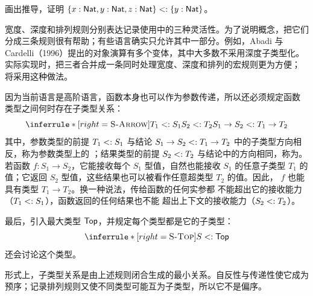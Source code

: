 \begin{exercise}[\(\star\)]
\label{ex:15.2.1}
画出推导，证明
\(\{x:\mathsf{Nat},y:\mathsf{Nat},z:\mathsf{Nat}\}\mathrel{<:}
\{y:\mathsf{Nat}\}\)。
\end{exercise}

宽度、深度和排列规则分别表达记录使用中的三种灵活性。为了说明概念，把它们
分成三条规则很有帮助；有些语言确实只允许其中一部分。例如，Abadi 与
Cardelli（1996）提出的对象演算有多个变体，其中大多数不采用深度子类型化。
实际实现时，把三者合并成一条同时处理宽度、深度和排列的宏规则更为方便；
将采用这种做法。

因为当前语言是高阶语言，函数本身也可以作为参数传递，所以还必须规定函数
类型之间何时存在子类型关系：
\[
\inferrule*[right=\textsc{S-Arrow}]
 {T_1\subtype S_1\\S_2\subtype T_2}
 {S_1\to S_2\subtype T_1\to T_2}
\]
其中，参数类型的前提 \(T_1\mathrel{<:} S_1\) 与结论
\(S_1\to S_2\mathrel{<:} T_1\to T_2\) 中的子类型方向相反，称为参数类型上的
；结果类型的前提 \(S_2\mathrel{<:} T_2\)
与结论中的方向相同，\mbox{称为}。若函数
\(f:S_1\to S_2\)，它能接收每个
\(S_1\) 型值，自然也能接收 \(S_1\) 的任意子类型 \(T_1\) 的值；它返回
\(S_2\) 型值，这些结果也可以被看作任意超类型 \(T_2\) 的值。因此，
\(f\) 也能具有类型 \(T_1\to T_2\)。换一种说法，传给函数的任何实参都
不能超出它的接收能力（\(T_1\mathrel{<:} S_1\)），函数返回的任何结果也不能
超出上下文的接收能力（\(S_2\mathrel{<:} T_2\)）。


最后，引入最大类型 \(\mathsf{Top}\)，并规定每个类型都是它的子类型：
\[
\inferrule*[right=\textsc{S-Top}]{ }{S\subtype\tapltype{Top}}
\]
还会讨论这个类型。

形式上，子类型关系是由上述规则闭合生成的最小关系。自反性与传递性使它成为
预序；记录排列规则又使不同类型可能互为子类型，所以它不是偏序。

